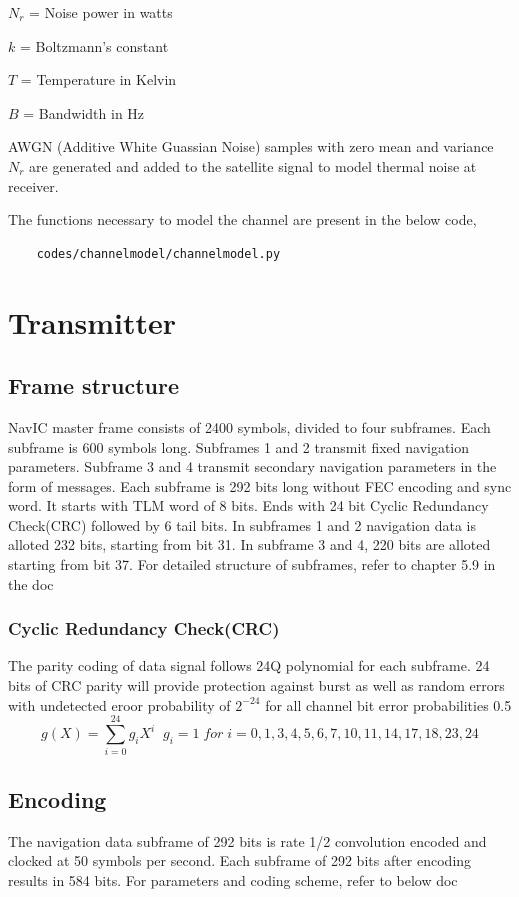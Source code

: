 \documentclass[11pt]{book}
\begin{document}
$N_r$ = Noise power in watts

$k$ = Boltzmann's constant

$T$ = Temperature in Kelvin

$B$ = Bandwidth in Hz

AWGN (Additive White Guassian Noise) samples with zero mean and variance $N_r$ are generated and added to the satellite signal to model thermal noise at receiver.

The functions necessary to model the channel are present in the below code,
\begin{lstlisting}
    codes/channelmodel/channelmodel.py
\end{lstlisting}

\chapter{Transmitter}

\section{Frame structure}
NavIC master frame consists of 2400 symbols, divided to four subframes. Each subframe is 600 symbols long. Subframes 1 and 2 transmit fixed navigation parameters. Subframe 3 and 4 transmit secondary navigation parameters in the form of messages. Each subframe is 292 bits long without FEC encoding and sync word. It starts with TLM word of 8 bits. Ends with 24 bit Cyclic Redundancy Check(CRC) followed by 6 tail bits. In subframes 1 and 2 navigation data is alloted 232 bits, starting from bit 31. In subframe 3 and 4, 220 bits are alloted starting from bit 37. For detailed structure of subframes, refer to chapter 5.9 in the doc
\subsection{Cyclic Redundancy Check(CRC)}
The parity coding of data signal follows 24Q polynomial for each subframe. 24 bits of CRC parity will provide protection against burst as well as random errors with undetected eroor probability of $2^{-24}$ for all channel bit error probabilities 0.5
\begin{equation}
    g(X) = \sum_{i = 0}^{24}g_{i}X^i\;\;
    g_{i}=1\; for\; i = 0,1,3,4,5,6,7,10,11,14,17,18,23,24
\end{equation}
\section{Encoding}
The navigation data subframe of 292 bits is rate 1/2 convolution encoded and clocked at 50 symbols per second. Each subframe of 292 bits after encoding results in 584 bits. For parameters and coding scheme, refer to below doc
\end{document}
